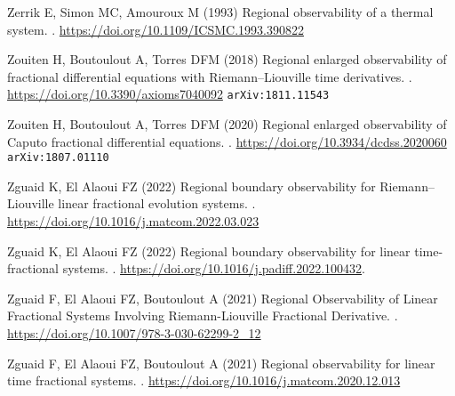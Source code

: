 \documentclass{article}
\begin{document}
\begin{thebibliography}{xx}
Zerrik E, Simon MC, Amouroux M (1993) 
\newblock Regional observability of a thermal system.
. 
\url{https://doi.org/10.1109/ICSMC.1993.390822}

Zouiten H, Boutoulout A, Torres DFM (2018) 
\newblock Regional enlarged observability of fractional 
differential equations with Riemann--Liouville time derivatives.
.
\url{https://doi.org/10.3390/axioms7040092} 
{\tt arXiv:1811.11543}

Zouiten H, Boutoulout A, Torres DFM (2020) 
\newblock Regional enlarged observability 
of Caputo fractional differential equations. 
.
\url{https://doi.org/10.3934/dcdss.2020060}
{\tt arXiv:1807.01110}

Zguaid K, El Alaoui FZ (2022) 
\newblock Regional boundary observability 
for Riemann--Liouville linear fractional evolution systems.
.
\url{https://doi.org/10.1016/j.matcom.2022.03.023}

Zguaid K, El Alaoui FZ (2022)
\newblock Regional boundary observability for linear time-fractional systems.
. 
\url{https://doi.org/10.1016/j.padiff.2022.100432}.

Zguaid F, El Alaoui FZ, Boutoulout A (2021) 
\newblock Regional Observability of Linear Fractional 
Systems Involving Riemann-Liouville Fractional Derivative.
.
\url{https://doi.org/10.1007/978-3-030-62299-2_12}

Zguaid F, El Alaoui FZ, Boutoulout A (2021) 
\newblock Regional observability for linear time fractional systems.
.
\url{https://doi.org/10.1016/j.matcom.2020.12.013}

\end{thebibliography}

\end{document}
